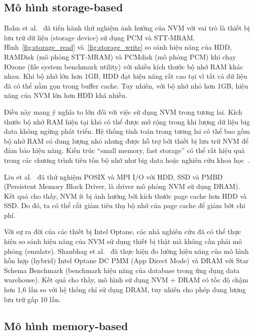 \subsection{Mô hình storage-based}



Bahn et al.~\cite{bahnImplicationsNVMBased2020} đã tiến hành thử nghiệm ảnh
hưởng của NVM với vai trò là thiết bị lưu trữ dữ liệu (storage device) sử dụng
PCM và STT-MRAM. Hình~\ref{fig:storage_read} và~\ref{fig:storage_write} so sánh
hiệu năng của HDD, RAMDisk (mô phỏng STT-MRAM) và PCMdisk (mô phỏng PCM) khi
chạy IOzone (file system benchmark utility) với nhiều kích thước bộ nhớ RAM
khác nhau. Khi bộ nhớ lớn hơn 1GB, HDD đạt hiệu năng rất cao tại vì tất cả dữ
liệu đã có thể nằm gọn trong buffer cache. Tuy nhiên, với bộ nhớ nhỏ hơn 1GB,
hiệu năng của NVM lớn hơn HDD khá nhiều.



Điều này mang ý nghĩa to lớn đối với việc sử dụng NVM trong tương lai. Kích
thước bộ nhớ RAM hiện tại khó có thể được mở rộng trong khi lượng dữ liệu big
data không ngừng phát triển. Hệ thống tính toán trong tương lai có thể bao gồm
bộ nhớ RAM có dung lượng nhỏ nhưng được hỗ trợ bởi thiết bị lưu trữ NVM để đảm
bảo hiệu năng. Kiến trúc ``small memory, fast storage'' có thể rất hiệu quả
trong các chương trình tiêu tốn bộ nhớ như big data hoặc nghiên cứu khoa
học~\cite{bahnImplicationsNVMBased2020}.

Liu et al.~\cite{liuPerformanceEvaluationModeling2017} đã thử nghiệm POSIX và
MPI I/O với HDD, SSD và PMBD (Persistent Memory Block Driver, là driver mô phỏng
NVM sử dụng DRAM). Kết quả cho thấy, NVM ít bị ảnh hưởng bởi kích thước page
cache hơn HDD và SSD. Do đó, ta có thể cắt giảm tiêu thụ bộ nhớ của page cache
để giảm bớt chi phí.

Với sự ra đời của các thiết bị Intel Optane, các nhà nghiên cứu đã có thể thực
hiện so sánh hiệu năng của NVM sử dụng thiết bị thật mà không cần phải mô phỏng
(emulate). Shanbhag et al.~\cite{shanbhagLargescaleInmemoryAnalytics2020} đã
thực hiện đo lường hiệu năng của mô hình hỗn hợp (hybrid) Intel Optane DC PMM
(App Direct Mode) và DRAM với Star Schema Benchmark (benchmark hiệu năng của
database trong ứng dụng data warehouse). Kết quả cho thấy, mô hình sử dụng NVM +
DRAM có tốc độ chậm hơn 1,6 lần so với hệ thống chỉ sử dụng DRAM, tuy nhiên cho
phép dung lượng lưu trữ gấp 10 lần.

\subsection{Mô hình memory-based}
